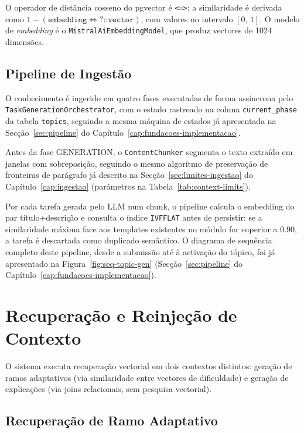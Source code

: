 O operador de distância cosseno do pgvector é \texttt{<=>}; a similaridade é derivada como $1 - (\texttt{embedding} \Leftrightarrow \texttt{?::vector})$, com valores no intervalo $[0,\,1]$.
O modelo de \textit{embedding} é o \texttt{MistralAiEmbeddingModel}, que produz vectores de 1024 dimensões.

\subsection*{Pipeline de Ingestão}

O conhecimento é ingerido em quatro fases executadas de forma assíncrona pelo \texttt{TaskGenerationOrchestrator}, com o estado rastreado na coluna \texttt{current\_phase} da tabela \texttt{topics}, seguindo a mesma máquina de estados já apresentada na Secção~\ref{sec:pipeline} do Capítulo~\ref{cap:fundacoes-implementacao}.

Antes da fase GENERATION, o \texttt{ContentChunker} segmenta o texto extraído em janelas com sobreposição, seguindo o mesmo algoritmo de preservação de fronteiras de parágrafo já descrito na Secção~\ref{sec:limites-ingestao} do Capítulo~\ref{cap:ingestao} (parâmetros na Tabela~\ref{tab:context-limits}).

Por cada tarefa gerada pelo LLM num chunk, o pipeline calcula o embedding do par título+descrição e consulta o índice \texttt{IVFFLAT} antes de persistir: se a similaridade máxima face aos templates existentes no módulo for superior a $0.90$, a tarefa é descartada como duplicado semântico. O diagrama de sequência completo deste pipeline, desde a submissão até à activação do tópico, foi já apresentado na Figura~\ref{fig:seq-topic-gen} (Secção~\ref{sec:pipeline} do Capítulo~\ref{cap:fundacoes-implementacao}).

\section{Recuperação e Reinjeção de Contexto} \label{sec:recuperacao}

O sistema executa recuperação vectorial em dois contextos distintos: geração de ramos adaptativos (via similaridade entre vectores de dificuldade) e geração de explicações (via joins relacionais, sem pesquisa vectorial).

\subsection*{Recuperação de Ramo Adaptativo}

